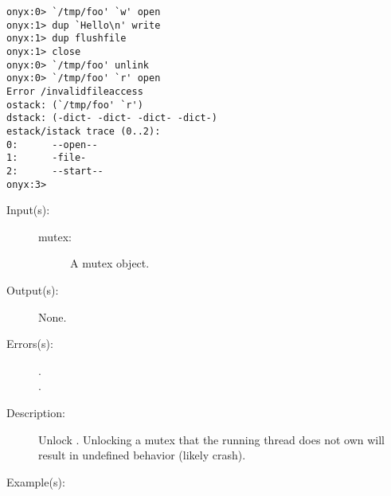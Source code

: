 \begin{description}
\begin{description}
\begin{verbatim}
onyx:0> `/tmp/foo' `w' open
onyx:1> dup `Hello\n' write
onyx:1> dup flushfile
onyx:1> close
onyx:0> `/tmp/foo' unlink
onyx:0> `/tmp/foo' `r' open
Error /invalidfileaccess
ostack: (`/tmp/foo' `r')
dstack: (-dict- -dict- -dict- -dict-)
estack/istack trace (0..2):
0:      --open--
1:      -file-
2:      --start--
onyx:3>
		\end{verbatim}
	\end{description}
\label{systemdict:unlock}
\item[{\onyxop{mutex}{unlock}{--}}: ]
	\begin{description}\item[]
	\item[Input(s): ]
		\begin{description}\item[]
		\item[mutex: ]
			A mutex object.
		\end{description}
	\item[Output(s): ] None.
	\item[Errors(s): ]
		\begin{description}\item[]
		\item[.]
		\item[.]
		\end{description}
	\item[Description: ]
		Unlock .  Unlocking a mutex that the running thread
		does not own will result in undefined behavior (likely crash).
	\item[Example(s): ]\begin{verbatim}


\end{verbatim}
\end{description}
\end{description}
